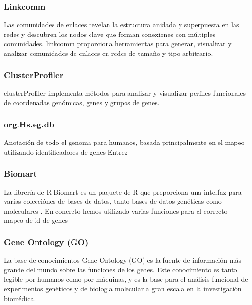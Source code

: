 \subsubsection{Linkcomm}

Las comunidades de enlaces revelan la estructura anidada y superpuesta en las redes y descubren los nodos clave que forman conexiones con múltiples comunidades. linkcomm \cite{Linkcomm_paper} proporciona herramientas para generar, visualizar y analizar comunidades de enlaces en redes de tamaño y tipo arbitrario.

\subsubsection{ClusterProfiler}

clusterProfiler \cite{ClusterProfiler_paper} implementa métodos para analizar y visualizar perfiles funcionales de coordenadas genómicas, genes y grupos de genes.

\subsubsection{org.Hs.eg.db} 

Anotación de todo el genoma para humanos, basada principalmente en el mapeo utilizando identificadores de genes Entrez

\subsubsection{Biomart}

La librería de R Biomart es un paquete de R que proporciona una interfaz para varias colecciónes de bases de datos, tanto bases de datos genéticas como moleculares \cite{biomart}. En concreto hemos utilizado varias funciones para el correcto mapeo de id de genes

\subsubsection{Gene Ontology (GO)}

La base de conocimientos Gene Ontology (GO) \cite{GO_doi} es la fuente de información más grande del mundo sobre las funciones de los genes. Este conocimiento es tanto legible por humanos como por máquinas, y es la base para el análisis funcional de experimentos genéticos y de biología molecular a gran escala en la investigación biomédica.






\hfill




\newpage